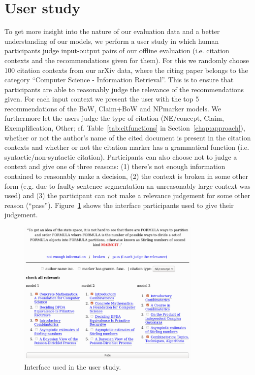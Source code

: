 \section{User study}\label{sec:oneval}
To get more insight into the nature of our evaluation data and a better understanding of our models, we perform a user study in which human participants judge input-output pairs of our offline evaluation (i.e. citation contexts and the recommendations given for them). For this we randomly choose 100 citation contexts from our arXiv data, where the citing paper belongs to the category ``Computer Science - Information Retrieval''. This is to ensure that participants are able to reasonably judge the relevance of the recommendations given. For each input context we present the user with the top 5 recommendations of the BoW, Claim+BoW and NPmarker models. We furthermore let the users judge the type of citation (NE/concept, Claim, Exemplification, Other; cf. Table~\ref{tab:citfunctions} in Section~\ref{chap:approach}), whether or not the author's name of the cited document is present in the citation contexts and whether or not the citation marker has a grammatical function (i.e. syntactic/non-syntactic citation). Participants can also choose not to judge a context and give one of three reasons: (1) there's not enough information contained to reasonably make a decision, (2) the context is broken in some other form (e.g. due to faulty sentence segmentation an unreasonably large context was used) and (3) the participant can not make a relevance judgement for some other reason (``pass''). Figure~\ref{fig:interface} shows the interface participants used to give their judgement.


\begin{figure}[]
  \centering
    \includegraphics[width=0.8\textwidth]{figures/evaluation/interface.png}
  \caption{Interface used in the user study.}
  \label{fig:interface}
\end{figure}

